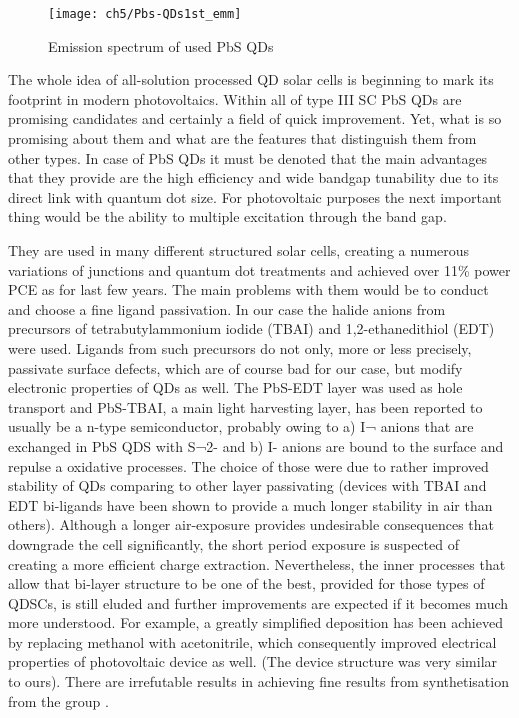 \begin{figure}[H]
\center
\texttt{[image: ch5/Pbs-QDs1st\_emm]}
\caption{Emission spectrum of used PbS QDs \cite{2011}}
\end{figure}

The whole idea of all-solution processed QD solar cells is beginning to mark its footprint in modern photovoltaics. Within all of type III SC PbS QDs are promising candidates and certainly a field of quick improvement. Yet, what is so promising about them and what are the features that distinguish them from other types. 
In case of PbS QDs it must be denoted that the main advantages that they provide are the high efficiency and wide bandgap tunability due to its direct link with quantum dot size. For photovoltaic purposes the next important thing would be the ability to multiple excitation through the band gap. 

They are used in many different structured solar cells, creating a numerous variations of junctions and quantum dot treatments and achieved over 11\% power PCE as for last few years. The main problems with them would be to conduct and choose a fine ligand passivation. In our case the halide anions from precursors of tetrabutylammonium iodide (TBAI) and 1,2-ethanedithiol (EDT) were used. Ligands from such precursors do not only, more or less precisely, passivate surface defects, which are of course bad for our case, but modify electronic properties of QDs as well. The PbS-EDT layer was used as hole transport and  PbS-TBAI, a main light harvesting layer,  has been reported to usually be a n-type semiconductor, probably owing to a) I¬  anions that are exchanged in PbS QDS with S¬2- and b) I- anions are bound to the surface and repulse a oxidative processes. The choice of those were due to rather improved stability of QDs comparing to other layer passivating (devices with TBAI and EDT bi-ligands have been shown to provide a much longer stability in air than others). Although a longer air-exposure provides undesirable consequences that downgrade the cell significantly, the short period exposure is suspected of creating a more efficient charge extraction. Nevertheless, the inner processes that allow that bi-layer structure to be one of the best, provided for those types of QDSCs, is still eluded and further improvements are expected if it becomes much more understood. For example, a greatly simplified deposition has been achieved by replacing methanol with acetonitrile, which consequently improved electrical properties of photovoltaic device as well. (The device structure was very similar to ours). There are irrefutable results in achieving fine results from synthetisation from the group\cite{Wang2017} \cite{Hu2016}.

